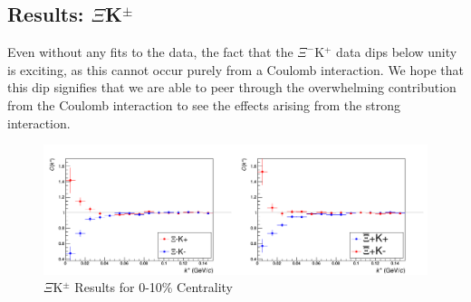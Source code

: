 \documentclass[../AnalysisNoteJBuxton.tex]{subfiles}
\begin{document}
\subsection{Results: \texorpdfstring{$\Xi$K$^{\pm}$}{TEXT}}
\label{ResultsXiK}

Even without any fits to the data, the fact that the $\Xi^{-}$K$^{+}$ data dips below unity is exciting, as this cannot occur purely from a Coulomb interaction.  We hope that this dip signifies that we are able to peer through the overwhelming contribution from the Coulomb interaction to see the effects arising from the strong interaction.

\begin{figure}[h]
  \centering
  \includegraphics[width=\textwidth]{7_ResultsAndDiscussion/Figures/cXicKchKStarCfs.png}
  \caption[$\Xi$K$^{\pm}$ Results]{$\Xi$K$^{\pm}$ Results for 0-10\% Centrality}
  \label{fig:XiKchwConjResults}
\end{figure}
\end{document}

